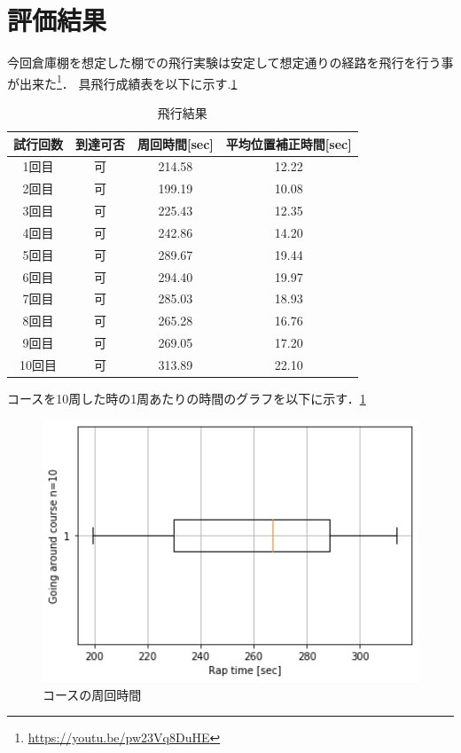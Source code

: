\section{評価結果}
今回倉庫棚を想定した棚での飛行実験は安定して想定通りの経路を飛行を行う事が出来た\footnote{\url{https://youtu.be/pw23Vq8DuHE}}．
具飛行成績表を以下に示す.\ref{table:fly_result}

\begin{table}[h]
    \caption{飛行結果}
    \label{table:fly_result}
    \centering
    \begin{tabular}{cccc}
        \hline
        試行回数 & 到達可否 & 周回時間[sec] & 平均位置補正時間[sec] \\
        \hline \hline
        1回目 & 可 & 214.58 & 12.22 \\
        2回目 & 可 & 199.19 & 10.08 \\
        3回目 & 可 & 225.43 & 12.35 \\
        4回目 & 可 & 242.86 & 14.20 \\
        5回目 & 可 & 289.67 & 19.44 \\
        6回目 & 可 & 294.40 & 19.97 \\
        7回目 & 可 & 285.03 & 18.93 \\
        8回目 & 可 & 265.28 & 16.76 \\
        9回目 & 可 & 269.05 & 17.20 \\
        10回目 & 可 & 313.89 & 22.10 \\
        \hline
    \end{tabular}
\end{table}

コースを10周した時の1周あたりの時間のグラフを以下に示す．\ref{rap_plot}

\begin{figure}[htbp]
  \begin{center}
    \includegraphics[clip,width=15.0cm]{img/rapdata.png}
    \caption{コースの周回時間}
    \label{rap_plot}
  \end{center}
\end{figure}

